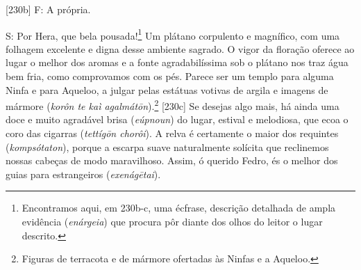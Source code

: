 {[}230b{]} F: A própria.

S: Por Hera, que bela pousada!\footnote{Encontramos aqui, em 230b-c, uma
  écfrase, descrição detalhada de ampla evidência (\emph{enárgeia}) que
  procura pôr diante dos olhos do leitor o lugar descrito.} Um plátano
corpulento e magnífico, com uma folhagem excelente e digna desse
ambiente sagrado. O vigor da floração oferece ao lugar o melhor dos
aromas e a fonte agradabilíssima sob o plátano nos traz água bem fria,
como comprovamos com os pés. Parece ser um templo para alguma Ninfa e
para Aqueloo, a julgar pelas estátuas votivas de argila e imagens de
mármore (\emph{korôn te kaì agalmátōn}).\footnote{Figuras de terracota e
  de mármore ofertadas às Ninfas e a Aqueloo.} {[}230c{]} Se desejas
algo mais, há ainda uma doce e muito agradável brisa (\emph{eúpnoun}) do
lugar, estival e melodiosa, que ecoa o coro das cigarras (\emph{tettígōn
chorôi}). A relva é certamente o maior dos requintes
(\emph{kompsótaton}), porque a escarpa suave naturalmente solícita que
reclinemos nossas cabeças de modo maravilhoso. Assim, ó querido Fedro,
és o melhor dos guias para estrangeiros (\emph{exenágētai}).

